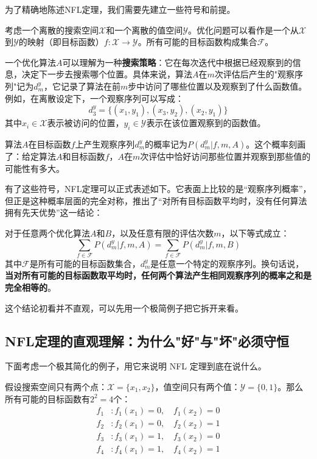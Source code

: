 \documentclass[lang=cn,zihao=-4,a4paper,fontset=windows]{beautybook}
\begin{document}
为了精确地陈述NFL定理，我们需要先建立一些符号和前提。

考虑一个离散的搜索空间$\mathcal{X}$和一个离散的值空间$\mathcal{Y}$。优化问题可以看作是一个从$\mathcal{X}$到$\mathcal{Y}$的映射（即目标函数）$f: \mathcal{X} \to \mathcal{Y}$。所有可能的目标函数构成集合$\mathcal{F}$。

一个优化算法$A$可以理解为一种\textbf{搜索策略}：它在每次迭代中根据已经观察到的信息，决定下一步去搜索哪个位置。具体来说，算法$A$在$m$次评估后产生的"观察序列"记为$d_m^y$，它记录了算法在前$m$步中访问了哪些位置以及观察到了什么函数值。例如，在离散设定下，一个观察序列可以写成：
\[
d_3^y = \{(x_1, y_1), (x_3, y_2), (x_2, y_1)\}
\]
其中$x_i \in \mathcal{X}$表示被访问的位置，$y_i \in \mathcal{Y}$表示在该位置观察到的函数值。

算法$A$在目标函数$f$上产生观察序列$d_m^y$的概率记为$P(d_m^y | f, m, A)$。这个概率刻画了：给定算法$A$和目标函数$f$，$A$在$m$次评估中恰好访问那些位置并观察到那些值的可能性有多大。

有了这些符号，NFL定理可以正式表述如下。它表面上比较的是“观察序列概率”，但正是这种概率层面的完全对称，推出了“对所有目标函数平均时，没有任何算法拥有先天优势”这一结论：

\begin{definition}
对于任意两个优化算法$A$和$B$，以及任意有限的评估次数$m$，以下等式成立：
\[
\sum_{f \in \mathcal{F}} P(d_m^y | f, m, A) = \sum_{f \in \mathcal{F}} P(d_m^y | f, m, B)
\]
其中$\mathcal{F}$是所有可能的目标函数集合，$d_m^y$是任意一个特定的观察序列。换句话说，\textbf{当对所有可能的目标函数取平均时，任何两个算法产生相同观察序列的概率之和是完全相等的}。
\end{definition}

这个结论初看并不直观，可以先用一个极简例子把它拆开来看。

\subsection{NFL定理的直观理解：为什么"好"与"坏"必须守恒}

下面考虑一个极其简化的例子，用它来说明 NFL 定理到底在说什么。

假设搜索空间只有两个点：$\mathcal{X} = \{x_1, x_2\}$，值空间只有两个值：$\mathcal{Y} = \{0, 1\}$。那么所有可能的目标函数有$2^2 = 4$个：
\begin{align*}
f_1 &: f_1(x_1) = 0, \quad f_1(x_2) = 0 \\
f_2 &: f_2(x_1) = 0, \quad f_2(x_2) = 1 \\
f_3 &: f_3(x_1) = 1, \quad f_3(x_2) = 0 \\
f_4 &: f_4(x_1) = 1, \quad f_4(x_2) = 1
\end{align*}
\end{document}
